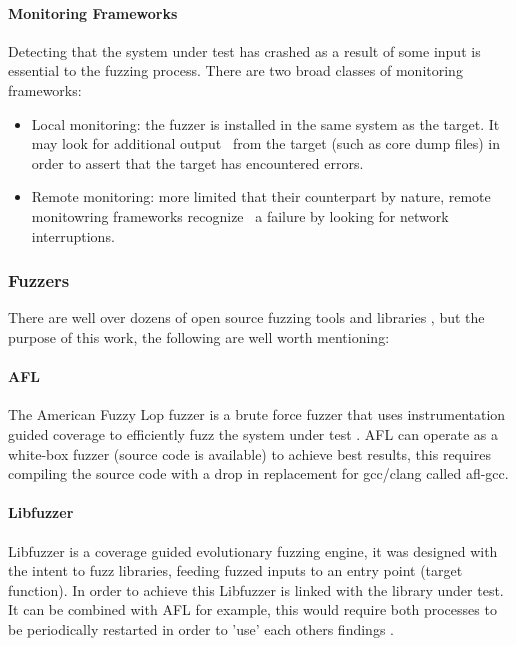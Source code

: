 
\paragraph{Monitoring Frameworks}

Detecting that the system under test has crashed as a result of some input is essential to the fuzzing process.
There are two broad classes of monitoring frameworks\cite{mcnally12}:

\begin{itemize}
    \item Local monitoring: the fuzzer is installed in the same system as the target. It may look for additional output \
    from the target (such as core dump files) in order to assert that the target has encountered errors.
    \item Remote monitoring: more limited that their counterpart by nature, remote monitowring frameworks recognize \
    a failure by looking for network interruptions.
\end{itemize}

\subsubsection{Fuzzers}

There are well over dozens of open source fuzzing tools and libraries \cite{awesome-fuzzing}, but the purpose of this work, the following
are well worth mentioning:


\paragraph{AFL}

The American Fuzzy Lop fuzzer is a brute force fuzzer that uses instrumentation guided coverage to 
efficiently fuzz the system under test \cite{afl}. AFL can operate as a white-box fuzzer (source code is available)
to achieve best results, this requires compiling the source code with a drop in replacement for gcc/clang
called afl-gcc. 


\paragraph{Libfuzzer}

Libfuzzer is a coverage guided evolutionary fuzzing engine, it was designed with the intent to fuzz 
libraries, feeding fuzzed inputs to an entry point (target function). In order to achieve this Libfuzzer
is linked with the library under test. It can be combined with AFL for example, this would require both processes to be 
periodically restarted in order to 'use' each others findings \cite{libfuzzer}. 


